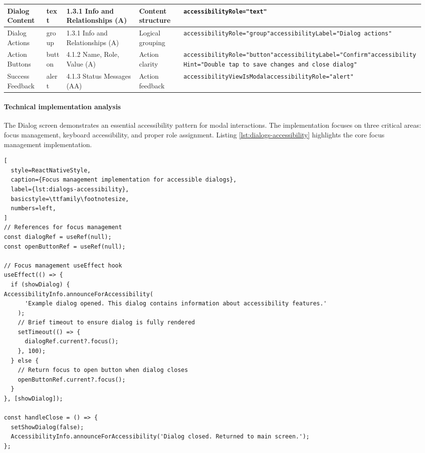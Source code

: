 \begin{longtable}{|p{2.5cm}|p{2cm}|p{2.8cm}|p{2.8cm}|p{4.3cm}|}
\hline
Dialog Content & text & 1.3.1 Info and Relationships (A) & Content structure & \texttt{accessibilityRole="text"} \\
\hline
Dialog Actions & group & 1.3.1 Info and Relationships (A) & Logical grouping & \texttt{accessibilityRole="group"}\newline \texttt{accessibilityLabel="Dialog actions"} \\
\hline
Action Buttons & button & 4.1.2 Name, Role, Value (A) & Action clarity & \texttt{accessibilityRole="button"}\newline \texttt{accessibilityLabel="Confirm"}\newline \texttt{accessibilityHint="Double tap to save changes and close dialog"} \\
\hline
Success Feedback & alert & 4.1.3 Status Messages (AA) & Action feedback & \texttt{accessibilityViewIsModal}\newline \texttt{accessibilityRole="alert"} \\
\end{longtable}

\paragraph{Technical implementation analysis}

The Dialog screen demonstrates an essential accessibility pattern for modal interactions. The implementation focuses on three critical areas: focus management, keyboard accessibility, and proper role assignment. Listing \ref{lst:dialogs-accessibility} highlights the core focus management implementation.

\begin{lstlisting}[
  style=ReactNativeStyle,
  caption={Focus management implementation for accessible dialogs},
  label={lst:dialogs-accessibility},
  basicstyle=\ttfamily\footnotesize,
  numbers=left,
]
// References for focus management
const dialogRef = useRef(null);
const openButtonRef = useRef(null);

// Focus management useEffect hook
useEffect(() => {
  if (showDialog) {
AccessibilityInfo.announceForAccessibility(
      'Example dialog opened. This dialog contains information about accessibility features.'
    );
    // Brief timeout to ensure dialog is fully rendered
    setTimeout(() => {
      dialogRef.current?.focus();
    }, 100);
  } else {
    // Return focus to open button when dialog closes
    openButtonRef.current?.focus();
  }
}, [showDialog]);

const handleClose = () => {
  setShowDialog(false);
  AccessibilityInfo.announceForAccessibility('Dialog closed. Returned to main screen.');
};
\end{lstlisting}

